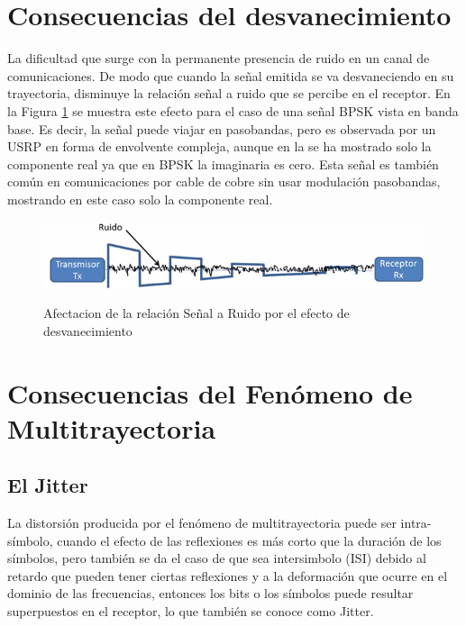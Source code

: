 \section{Consecuencias del desvanecimiento}

La dificultad que surge con la permanente presencia de ruido en un canal de comunicaciones. De modo que cuando la señal emitida se va desvaneciendo en su trayectoria, disminuye la relación señal a ruido que se percibe en el receptor. En la Figura \ref{fig:Ruido-canal} se muestra este efecto para el caso de una señal BPSK vista en banda base. Es decir, la señal puede viajar en pasobandas, pero es observada por un USRP en forma de envolvente compleja, aunque en la se ha mostrado solo la componente real ya que en BPSK la imaginaria es cero. Esta señal es también común en comunicaciones por cable de cobre sin usar modulación pasobandas, mostrando en este caso solo la componente real.

\begin{figure}[h!]
	\captionsetup{justification = raggedright, singlelinecheck = false}
	\caption{Afectacion de la relación Señal a Ruido por el efecto de desvanecimiento} 
	\centering
	\includegraphics[scale=1]{Imagenes/Ruido-canal.png}
	\label{fig:Ruido-canal}
\end{figure}



\section{Consecuencias del Fenómeno de Multitrayectoria}



\subsection{El Jitter}
La distorsión producida por el fenómeno de multitrayectoria puede ser intra-símbolo, cuando el efecto de las reflexiones es más corto que la duración de los símbolos, pero también se da el caso de que sea intersimbolo (ISI) debido al retardo que pueden tener ciertas reflexiones y a la deformación que ocurre en el dominio de las frecuencias, entonces los bits o los símbolos puede resultar superpuestos en el receptor, lo que también se conoce como Jitter. \\

